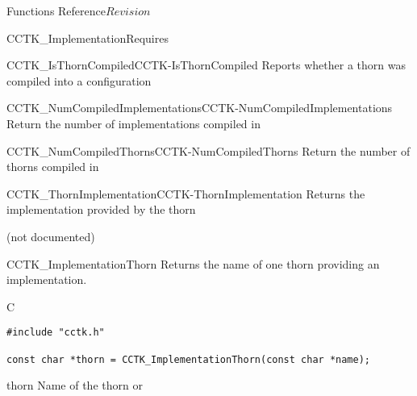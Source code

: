 \begin{cactuspart}{ Functions Reference}{}{$Revision$}
\begin{FunctionDescription}{CCTK\_ImplementationRequires}
\begin{SeeAlsoSection}
\begin{SeeAlso2}{CCTK\_IsThornCompiled}{CCTK-IsThornCompiled}
  Reports whether a thorn was compiled into a configuration
\end{SeeAlso2}
\begin{SeeAlso2}{CCTK\_NumCompiledImplementations}{CCTK-NumCompiledImplementations}
  Return the number of implementations compiled in
\end{SeeAlso2}
\begin{SeeAlso2}{CCTK\_NumCompiledThorns}{CCTK-NumCompiledThorns}
  Return the number of thorns compiled in
\end{SeeAlso2}
\begin{SeeAlso2}{CCTK\_ThornImplementation}{CCTK-ThornImplementation}
  Returns the implementation provided by the thorn
\end{SeeAlso2}
\end{SeeAlsoSection}

\begin{ErrorSection}
\begin{Error}{}
(not documented)
\end{Error}
\end{ErrorSection}

\end{FunctionDescription}



\begin{FunctionDescription}{CCTK\_ImplementationThorn}
\label{CCTK-ImplementationThorn}
Returns the name of one thorn providing an implementation.

\begin{SynopsisSection}
\begin{Synopsis}{C}
\begin{verbatim}
#include "cctk.h"

const char *thorn = CCTK_ImplementationThorn(const char *name);
\end{verbatim}
\end{Synopsis}
\end{SynopsisSection}

\begin{ResultSection}
\begin{Result}{thorn}
Name of the thorn or 
\end{Result}
\end{ResultSection}


\end{FunctionDescription}
\end{cactuspart}
